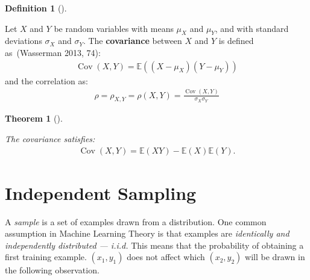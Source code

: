\documentclass[
  letterpaper,
  12pt,
  british]{tufte-book}
\theoremstyle{plain}
\theoremstyle{definition}
\newtheorem{definition}{Definition}[chapter]
\theoremstyle{plain}
\newtheorem{theorem}{Theorem}[chapter]
\theoremstyle{remark}
\begin{document}
\leavevmode{}%
\begin{definition}[]\label{def-covariance}

Let \({\mathit{X}}\) and \({\mathit{Y}}\) be random variables with means
\(\mu_{\mathit{X}}\) and \(\mu_{\mathit{Y}}\), and with standard
deviations \(\sigma_{\mathit{X}}\) and \(\sigma_{\mathit{Y}}\). The
\textbf{covariance} between \({\mathit{X}}\) and \({\mathit{Y}}\) is
defined as~(Wasserman 2013,
74):
\begin{align}
\operatorname{Cov}({\mathit{X}},{\mathit{Y}}) = \mathbb{E}(({\mathit{X}} - \mu_{\mathit{X}})({\mathit{Y}} - \mu_{\mathit{Y}}))
\end{align} and the correlation as: \begin{align}
\rho = \rho_{{\mathit{X}},{\mathit{Y}}} = \rho({\mathit{X}},{\mathit{Y}}) = \frac{\operatorname{Cov}({\mathit{X}},{\mathit{Y}})}{\sigma_{\mathit{X}} \sigma_{\mathit{Y}}}
\end{align}

\end{definition}

\leavevmode{}%
\begin{theorem}[]\label{thm-covariance}

The covariance satisfies: \begin{align}
\operatorname{Cov}({\mathit{X}},{\mathit{Y}})=\mathbb{E}({\mathit{X}}{\mathit{Y}})- \mathbb{E}({\mathit{X}}) \mathbb{E}({\mathit{Y}}).
\end{align}

\end{theorem}

\hypertarget{independent-sampling}{%
\section{Independent Sampling}\label{independent-sampling}}

A \emph{sample} is a set of examples drawn from a
distribution. One common assumption in Machine Learning Theory is that
examples are \emph{identically and independently distributed --- i.i.d.}
This means that the probability of obtaining a first training example.
\((\mathit{x}_1, \mathit{y}_1)\) does not affect which
\((\mathit{x}_2, \mathit{y}_2)\) will be drawn in the following
observation.
\end{document}
